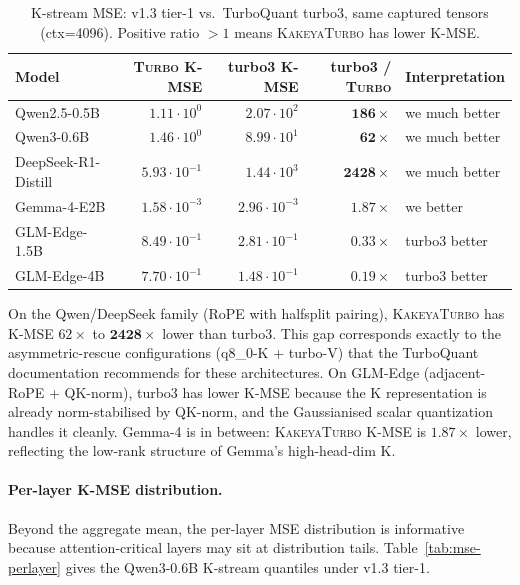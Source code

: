 \documentclass[11pt,a4paper]{article}
\theoremstyle{definition}
\theoremstyle{plain}
\begin{document}
\begin{table}[H]
\centering
\small
\caption{K-stream MSE: v1.3 tier-1 vs.\ TurboQuant turbo3, same captured tensors (ctx=4096). Positive ratio $>1$ means \textsc{KakeyaTurbo} has lower K-MSE.}
\label{tab:mse-vs-turbo3}
\begin{tabular}{lrrrl}
  \toprule
  Model & \textsc{Turbo} K-MSE & turbo3 K-MSE & turbo3 / \textsc{Turbo} & Interpretation \\
  \midrule
  Qwen2.5-0.5B                  & $1.11\!\cdot\!10^{0}$  & $2.07\!\cdot\!10^{2}$  & $\mathbf{186\times}$   & we much better \\
  Qwen3-0.6B                    & $1.46\!\cdot\!10^{0}$  & $8.99\!\cdot\!10^{1}$  & $\mathbf{62\times}$    & we much better \\
  DeepSeek-R1-Distill           & $5.93\!\cdot\!10^{-1}$ & $1.44\!\cdot\!10^{3}$  & $\mathbf{2428\times}$  & we much better \\
  Gemma-4-E2B                   & $1.58\!\cdot\!10^{-3}$ & $2.96\!\cdot\!10^{-3}$ & $1.87\times$           & we better \\
  GLM-Edge-1.5B                 & $8.49\!\cdot\!10^{-1}$ & $2.81\!\cdot\!10^{-1}$ & $0.33\times$           & turbo3 better \\
  GLM-Edge-4B                   & $7.70\!\cdot\!10^{-1}$ & $1.48\!\cdot\!10^{-1}$ & $0.19\times$           & turbo3 better \\
  \bottomrule
\end{tabular}
\end{table}

On the Qwen/DeepSeek family (RoPE with halfsplit pairing), \textsc{KakeyaTurbo} has K-MSE $62\times$ to $\mathbf{2428\times}$ lower than turbo3. This gap corresponds exactly to the asymmetric-rescue configurations (q8\_0-K + turbo-V) that the TurboQuant documentation recommends for these architectures. On GLM-Edge (adjacent-RoPE + QK-norm), turbo3 has lower K-MSE because the K representation is already norm-stabilised by QK-norm, and the Gaussianised scalar quantization handles it cleanly. Gemma-4 is in between: \textsc{KakeyaTurbo} K-MSE is $1.87\times$ lower, reflecting the low-rank structure of Gemma's high-head-dim K.

\paragraph{Per-layer K-MSE distribution.}
Beyond the aggregate mean, the per-layer MSE distribution is informative because attention-critical layers may sit at distribution tails. Table~\ref{tab:mse-perlayer} gives the Qwen3-0.6B K-stream quantiles under v1.3 tier-1.
\end{document}
